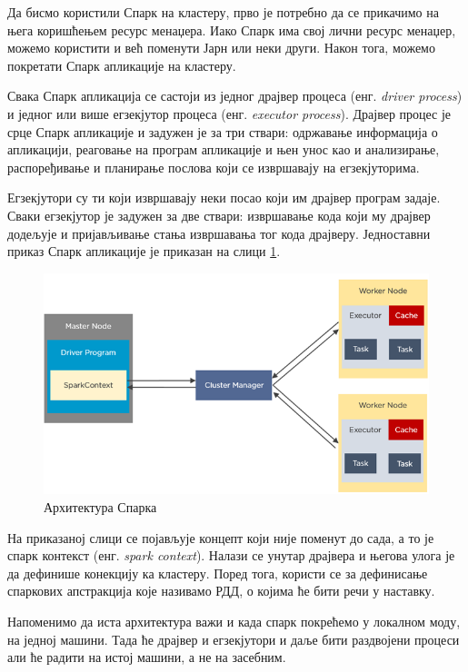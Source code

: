 \documentclass[12pt,oneside]{memoir}
\begin{document}
Да бисмо користили Спарк на кластеру, прво је потребно да се прикачимо на њега коришћењем ресурс менаџера. Иако Спарк има свој лични ресурс менаџер, можемо користити и већ поменути Јарн или неки други. Након тога, можемо покретати Спарк апликације на кластеру.

Свака Спарк апликација се састоји из једног драјвер процеса (енг. \textit{driver process}) и једног или више егзекјутор процеса (енг. \textit{executor process}). Драјвер процес је срце Спарк апликације и задужен је за три ствари: одржавање информација о апликацији, реаговање на програм апликације и њен унос као и анализирање, распоређивање и планирање послова који се извршавају на егзекјуторима. 

Егзекјутори су ти који извршавају неки посао који им драјвер програм задаје. Сваки егзекјутор је задужен за две ствари: извршавање кода који му драјвер додељује и пријављивање стања извршавања тог кода драјверу. Једноставни приказ Спарк апликације је приказан на слици \ref{fig:spark_arhtt}. \cite{spark_guide}

\begin{figure}[!ht]
  \centering
  \includegraphics[width=1\textwidth]{pictures/spark_architecture.png}
  \caption{Архитектура Спарка}
  \label{fig:spark_arhtt}
\end{figure}

На приказаној слици се појављује концепт који није поменут до сада, а то је спарк контекст (енг. \textit{spark context}). Налази се унутар драјвера и његова улога је да дефинише конекцију ка кластеру. Поред тога, користи се за дефинисање спаркових апстракција које називамо РДД, о којима ће бити речи у наставку. 

Напоменимо да иста архитектура важи и када спарк покрећемо у локалном моду, на једној машини. Тада ће драјвер и егзекјутори и даље бити раздвојени процеси али ће радити на истој машини, а не на засебним. \cite{spark_guide}
\end{document}

